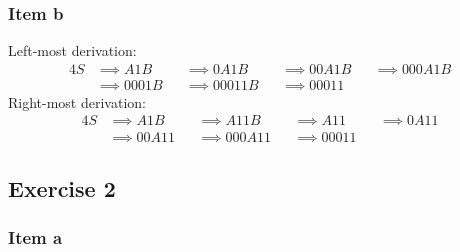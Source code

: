 \documentclass[docid=TP08]{tcom_TP}
\begin{document}
{\subsubsection{Item b}
\begin{minipage}[b]{0.6\textwidth}
	Left-most derivation:
	\begin{alignat*}{4}
		S &\implies A1B   &&\implies 0A1B   &&\implies 00A1B &&\implies 000A1B \\
		  &\implies 0001B &&\implies 00011B &&\implies 00011 &&
	\end{alignat*}
	Right-most derivation:
	\begin{alignat*}{4}
		S &\implies A1B   &&\implies A11B   &&\implies A11   &&\implies 0A11 \\
		  &\implies 00A11 &&\implies 000A11 &&\implies 00011 &&
	\end{alignat*}
\end{minipage}
\begin{minipage}[c]{0.3\textwidth}
	\begin{center}
	\end{center}
\end{minipage}
\pagebreak
\subsection{Exercise 2}
\begin{minipage}[c]{0.4\textwidth}
\subsubsection{Item a}
\begin{center}
\end{center}
\end{minipage}%
\begin{minipage}[c]{0.6\textwidth}

\end{minipage}}
\end{document}
